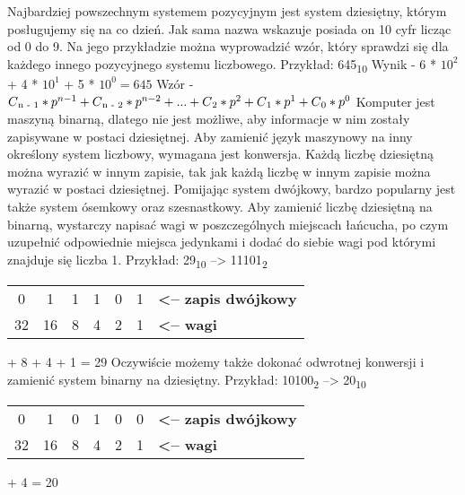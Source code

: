 \documentclass[12pt, a4paper, onside, polish]{article}				%
\begin{document}
\vspace{10mm}
Najbardziej powszechnym systemem pozycyjnym jest system dziesiętny, którym posługujemy się na co dzień. Jak sama nazwa wskazuje posiada on 10 cyfr licząc od 0 do 9. Na jego przykładzie można wyprowadzić wzór, który sprawdzi się dla każdego innego pozycyjnego systemu liczbowego.
\vspace{5mm}
\newline
Przykład: {645\textsubscript{10}}
\vspace{5mm}
\newline
Wynik - 6 * $10^{2}$ + 4 * $10^{1}$ + 5 * $10^{0} = 645$
\newline
Wzór - $C\textsubscript{n - 1} * p^{n - 1} + C\textsubscript{n - 2} * p^{n - 2} + ... + C\textsubscript{2} * p^{2} + C\textsubscript{1} * p^{1} + C\textsubscript{0} * p^{0}$
\newpage
Komputer jest maszyną binarną, dlatego nie jest możliwe, aby informacje w nim zostały zapisywane w postaci dziesiętnej. Aby zamienić język maszynowy na inny określony system liczbowy, wymagana jest konwersja. Każdą liczbę dziesiętną można wyrazić w innym zapisie, tak jak każdą liczbę w innym zapisie można wyrazić w postaci dziesiętnej. Pomijając system dwójkowy, bardzo popularny jest także system ósemkowy oraz szesnastkowy. Aby zamienić liczbę dziesiętną na binarną, wystarczy napisać wagi w poszczególnych miejscach łańcucha, po czym uzupełnić odpowiednie miejsca jedynkami i dodać do siebie wagi pod którymi znajduje się liczba 1. 
\vspace{5mm}
\newline
Przykład: 29\textsubscript{10} -->  11101\textsubscript{2}
\begin{table}[htb]
\centering
\begin{tabular}{ccccccl}
0  & 1  & 1 & 1 & 0 & 1 & \textbf{\textless{}-- zapis dwójkowy} \\ \cline{1-6}
32 & 16 & 8 & 4 & 2 & 1 & \textbf{\textless{}-- wagi}          
\end{tabular}
\end{table}
 + 8 + 4 + 1 = 29
\vspace{10mm}
\newline
Oczywiście możemy także dokonać odwrotnej konwersji i zamienić system binarny na dziesiętny. 
\vspace{5mm}
\newline
Przykład: 10100\textsubscript{2} -->  20\textsubscript{10}
\begin{table}[htb]
\centering
\begin{tabular}{ccccccl}
0  & 1  & 0 & 1 & 0 & 0 & \textbf{\textless{}-- zapis dwójkowy} \\ \cline{1-6}
32 & 16 & 8 & 4 & 2 & 1 & \textbf{\textless{}-- wagi}          
\end{tabular}
\end{table}
 + 4 = 20
\end{document}
